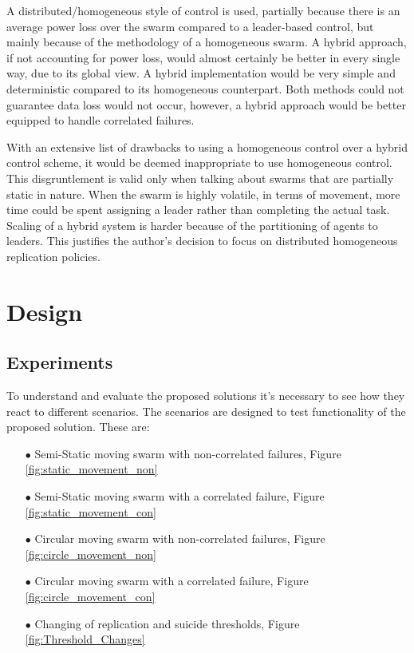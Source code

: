 \documentclass{UoYCSproject}
\begin{document}
A distributed/homogeneous style of control is used, partially because there is an average power loss over the swarm compared to a leader-based control, but mainly because of the methodology of a homogeneous swarm. A hybrid approach, if not accounting for power loss, would almost certainly be better in every single way, due to its global view. A hybrid implementation would be very simple and deterministic compared to its homogeneous counterpart. Both methods could not guarantee data loss would not occur, however, a hybrid approach would be better equipped to handle correlated failures.

With an extensive list of drawbacks to using a homogeneous control over a hybrid control scheme, it would be deemed inappropriate to use homogeneous control. This disgruntlement is valid only when talking about swarms that are partially static in nature. When the swarm is highly volatile, in terms of movement, more time could be spent assigning a leader rather than completing the actual task. Scaling of a hybrid system is harder because of the partitioning of agents to leaders. This justifies the author's decision to focus on distributed homogeneous replication policies.




\chapter{Design}
\label{cha:Design}

\section{Experiments}
\label{sec:expriments}

To understand and evaluate the proposed solutions it’s necessary to see how they react to different scenarios.
The scenarios are designed to test functionality of the proposed solution.
These are:

\begin{itemize}
\itemsep-1em
\item[$\bullet$] Semi-Static moving swarm with non-correlated failures, Figure \ref{fig:static_movement_non}
\item[$\bullet$] Semi-Static moving swarm with a correlated failure, Figure \ref{fig:static_movement_con}
\item[$\bullet$] Circular moving swarm with non-correlated failures, Figure \ref{fig:circle_movement_non}
\item[$\bullet$] Circular moving swarm with a correlated failure, Figure \ref{fig:circle_movement_con}
\item[$\bullet$] Changing of replication and suicide thresholds, Figure \ref{fig:Threshold_Changes}
\end{itemize}
\end{document}
